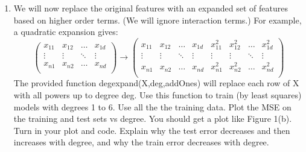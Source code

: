 \documentclass[11pt]{article}
\begin{document}
\begin{enumerate}
	\item We will now replace the original features with an expanded set of features based on higher order terms. (We
	will ignore interaction terms.) For example, a quadratic expansion gives:
	\begin{equation}
		\begin{pmatrix}
			x_{11} & x_{12} & \dots & x_{1d} \\
			\vdots& \vdots & \ddots & \vdots \\
			x_{n1}& x_{n2} & \dots & x_{nd} \\
		\end{pmatrix}\xrightarrow[]{}\begin{pmatrix}
			x_{11} & x_{12} & \dots & x_{1d}& x_{11}^2 & x_{12}^2 & \dots & x_{1d}^2\\
			\vdots& \vdots & \ddots & \vdots&\vdots& \vdots & \ddots & \vdots \\
			x_{n1}& x_{n2} & \dots & x_{nd}& x_{n1}^2& x_{n2}^2 & \dots & x_{nd}^2\\
		\end{pmatrix}
	\end{equation}
The provided function degexpand(X,deg,addOnes) will replace each row of X with all powers up to degree deg. Use
this function to train (by least squares) models with degrees 1 to 6. Use all the the training data. Plot the MSE on
the training and test sets vs degree. You should get a plot like Figure 1(b). Turn in your plot and code. Explain
why the test error decreases and then increases with degree, and why the train error decreases with degree.\\


\end{enumerate}
\end{document}
